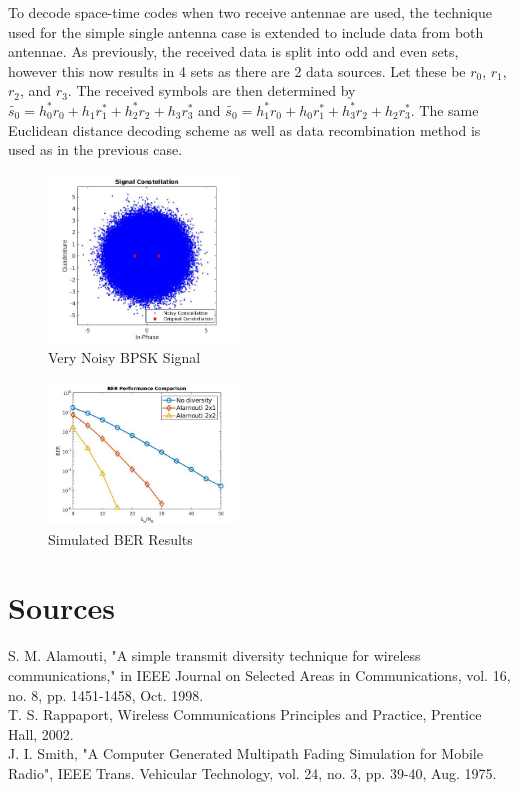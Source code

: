 \documentclass[twocolumn]{article}
\begin{document}
To decode space-time codes when two receive antennae are used, the technique used for the simple single antenna case is extended to include data from both antennae. As previously, the received data is split into odd and even sets, however this now results in 4 sets as there are 2 data sources. Let these be $r_0$, $r_1$, $r_2$, and $r_3$. The received symbols are then determined by  $\tilde{s_0} = h_0^*r_0 + h_1r_1^* + h_2^*r_2 + h_3r_3^*$ and $\tilde{s_0} = h_1^*r_0 + h_0r_1^* + h_3^*r_2 + h_2r_3^*$. The same Euclidean distance decoding scheme as well as data recombination method is used as in the previous case.

\begin{figure}[h]
    \centering
    \includegraphics[width=0.45\textwidth]{Sig_Const.jpg}
    \caption{Very Noisy BPSK Signal}
    \label{fig:my_label}
\end{figure}

\begin{figure}[]
    \centering
    \includegraphics[width=0.45\textwidth]{BER.jpg}
    \caption{Simulated BER Results}
    \label{fig:my_label}
\end{figure}


\section{Sources}
S. M. Alamouti, "A simple transmit diversity technique for wireless communications," in IEEE Journal on Selected Areas in Communications, vol. 16, no. 8, pp. 1451-1458, Oct. 1998. \\
\noindent
T. S. Rappaport, Wireless Communications Principles and Practice, Prentice Hall, 2002. \\
\noindent
J. I. Smith, "A Computer Generated Multipath Fading Simulation for Mobile Radio", IEEE Trans. Vehicular Technology, vol. 24, no. 3, pp. 39-40, Aug. 1975.
 
\end{document}
